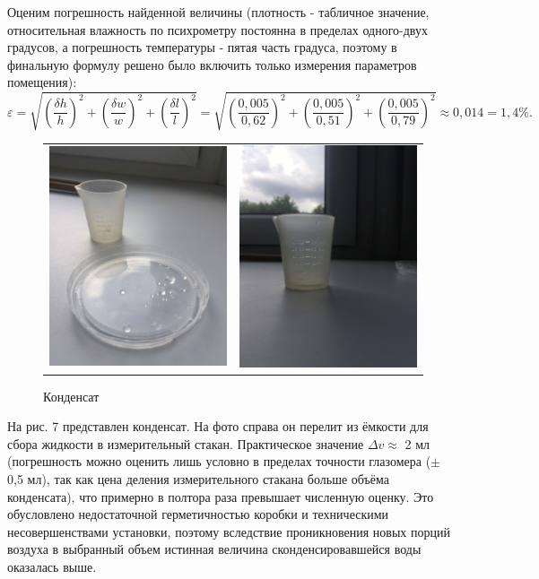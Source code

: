 \documentclass[a4paper,12pt]{article} %
\begin{document}
{Оценим погрешность найденной величины (плотность - табличное значение, относительная влажность по психрометру постоянна в пределах одного-двух градусов, а погрешность температуры - пятая часть градуса, поэтому в финальную формулу решено было включить только измерения параметров помещения): $$\varepsilon = \sqrt{\left(\dfrac{\delta h}{h}\right)^2 + \left(\dfrac{\delta w}{w}\right)^2 + \left(\dfrac{\delta l}{l}\right)^2} = \sqrt{\left(\dfrac{0,005}{0,62}\right)^2 + \left(\dfrac{0,005}{0,51}\right)^2 + \left(\dfrac{0,005}{0,79}\right)^2} \approx 0,014 = 1,4\%.$$

\begin{figure}[ht]\center
\begin{tabular}{cc}
\includegraphics[width=65mm]{xexek.jpg}
&
\includegraphics[width=65mm]{xexe.jpg}
\end{tabular}
\caption{Конденсат}
\end{figure}

На рис. 7 представлен конденсат. На фото справа он перелит из ёмкости для сбора жидкости в измерительный стакан. Практическое значение $\Delta v \approx$ 2 мл (погрешность можно оценить лишь условно в пределах точности глазомера ($\pm$ 0,5 мл), так как цена деления измерительного стакана больше объёма конденсата), что примерно в полтора раза превышает численную оценку. Это обусловлено недостаточной герметичностью коробки и техническими несовершенствами установки, поэтому вследствие проникновения новых порций воздуха в выбранный объем истинная величина сконденсировавшейся воды оказалась выше.


}
\end{document}
